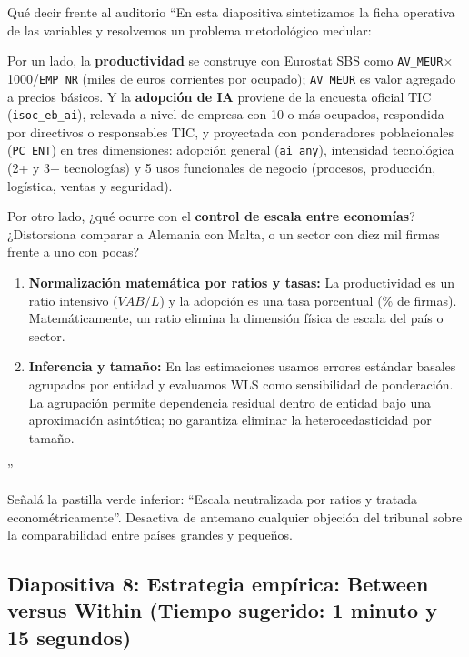 \documentclass[11pt,a4paper]{article}
\begin{document}
\begin{speechbox}{Qué decir frente al auditorio}
``En esta diapositiva sintetizamos la ficha operativa de las variables y resolvemos un problema metodológico medular:

Por un lado, la \textbf{productividad} se construye con Eurostat SBS como \texttt{AV\_MEUR}$\times$1000/\texttt{EMP\_NR} (miles de euros corrientes por ocupado); \texttt{AV\_MEUR} es valor agregado a precios básicos. Y la \textbf{adopción de IA} proviene de la encuesta oficial TIC (\texttt{isoc\_eb\_ai}), relevada a nivel de empresa con 10 o más ocupados, respondida por directivos o responsables TIC, y proyectada con ponderadores poblacionales (\texttt{PC\_ENT}) en tres dimensiones: adopción general (\texttt{ai\_any}), intensidad tecnológica (2+ y 3+ tecnologías) y 5 usos funcionales de negocio (procesos, producción, logística, ventas y seguridad).

Por otro lado, ¿qué ocurre con el \textbf{control de escala entre economías}? ¿Distorsiona comparar a Alemania con Malta, o un sector con diez mil firmas frente a uno con pocas?
\begin{enumerate}[itemsep=0.15em]
  \item \textbf{Normalización matemática por ratios y tasas:} La productividad es un ratio intensivo ($VAB/L$) y la adopción es una tasa porcentual (\% de firmas). Matemáticamente, un ratio elimina la dimensión física de escala del país o sector.
  \item \textbf{Inferencia y tamaño:} En las estimaciones usamos errores estándar basales agrupados por entidad y evaluamos WLS como sensibilidad de ponderación. La agrupación permite dependencia residual dentro de entidad bajo una aproximación asintótica; no garantiza eliminar la heterocedasticidad por tamaño.
\end{enumerate}''
\end{speechbox}

\begin{tipbox}
Señalá la pastilla verde inferior: ``Escala neutralizada por ratios y tratada econométricamente''. Desactiva de antemano cualquier objeción del tribunal sobre la comparabilidad entre países grandes y pequeños.
\end{tipbox}

\subsection*{Diapositiva 8: Estrategia empírica: Between versus Within (Tiempo sugerido: 1 minuto y 15 segundos)}
\end{document}
